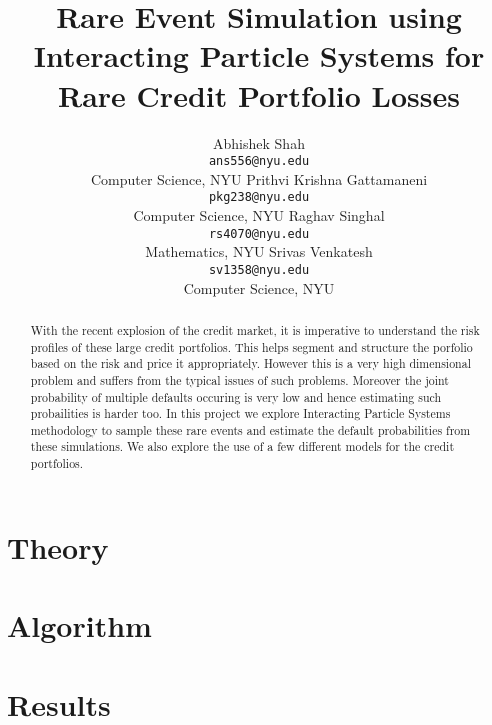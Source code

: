 \documentclass{article}
\title{Rare Event Simulation using Interacting Particle Systems for Rare Credit Portfolio Losses}
\author{
  Abhishek Shah \\
  \texttt{ans556@nyu.edu}\\
  Computer Science,  NYU
  \And
  Prithvi Krishna Gattamaneni\\
  \texttt{pkg238@nyu.edu}\\
  Computer Science,  NYU
  \AND
  Raghav Singhal\\
  \texttt{rs4070@nyu.edu}\\
  Mathematics, NYU
  \And
  Srivas Venkatesh \\
  \texttt{sv1358@nyu.edu} \\
  Computer Science,  NYU
}
\begin{document}
\maketitle

\begin{abstract}
	With the recent explosion of the credit market, it is imperative to understand
	the risk profiles of these large credit portfolios. This helps segment and
	structure the porfolio based on the risk and price it appropriately. However
	this is a very high dimensional problem and suffers from the typical issues
	of such problems. Moreover the joint probability of multiple defaults
	occuring is very low and hence estimating such probailities is harder too.
	In this project we explore Interacting Particle Systems methodology to sample 
	these rare events and estimate the default probabilities from these simulations.
	We also explore the use of a few different models for the credit portfolios.
\end{abstract}

\section{Theory}

\section{Algorithm}

\section{Results}


\clearpage

\end{document}
